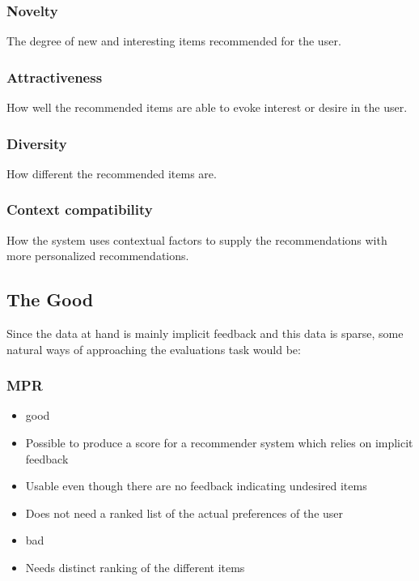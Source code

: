 \subsubsection{Novelty}
The degree of new and interesting items recommended for the user.

\subsubsection{Attractiveness}
How well the recommended items are able to evoke interest or desire in the user.

\subsubsection{Diversity}
How different the recommended items are.

\subsubsection{Context compatibility}
How the system uses contextual factors to supply the recommendations with more personalized recommendations.


\subsection{The Good}
Since the data at hand is mainly implicit feedback and this data is sparse, some natural ways of approaching the evaluations task would be:

\subsubsection{MPR}
\begin{itemize}
	\item good
	\item Possible to produce a score for a recommender system which relies on implicit feedback
	\item Usable even though there are no feedback indicating undesired items
	\item Does not need a ranked list of the actual preferences of the user
	\item bad
	\item Needs distinct ranking of the different items
\end{itemize}

